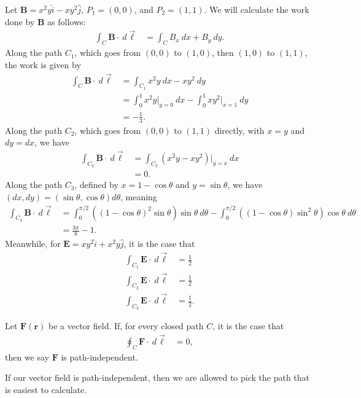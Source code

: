 \documentclass[10pt]{mypackage}
\begin{document}
\begin{example}
  Let $\mathbf{B} = x^2y\widehat{i} - xy^2\widehat{j}$, $P_1 = (0,0)$, and $P_2 = (1,1)$. We will calculate the work done by $\mathbf{B}$ as follows:
  \begin{align*}
    \int_{C}^{} \mathbf{B}\cdot\:d\vec{\ell} &= \int_{C}^{} B_x\:dx + B_y\:dy.
  \end{align*}
  Along the path $C_1$, which goes from $(0,0)$ to $(1,0)$, then $(1,0)$ to $(1,1)$, the work is given by
  \begin{align*}
    \int_{C}^{} \mathbf{B}\cdot\:d\vec{\ell} &= \int_{C_1}^{} x^2y\:dx-xy^2\:dy\\
                                             &= \int_{0}^{1} x^2y\bigr\vert_{y=0}\:dx - \int_{0}^{1} xy^2\bigr\vert_{x=1}\:dy\\
                                             &= -\frac{1}{3}.
  \end{align*}
  Along the path $C_2$, which goes from $(0,0)$ to $(1,1)$ directly, with $x = y$ and $dy = dx$, we have
  \begin{align*}
    \int_{C_2}^{} \mathbf{B}\cdot\:d\vec{\ell} &= \int_{C_2}^{} \left(x^2y-xy^2\right)\bigr\vert_{y=x}\:dx\\
                                               &= 0.
  \end{align*}
  Along the path $C_3$, defined by $x = 1-\cos\theta$ and $y = \sin\theta$, we have $\left(dx,dy\right) = \left(\sin\theta,\cos\theta\right)d\theta$, meaning
  \begin{align*}
    \int_{C_3}^{} \mathbf{B}\cdot\:d\vec{\ell} &= \int_{0}^{\pi/2} \left(\left(1-\cos\theta\right)^2\sin\theta\right)\sin\theta\:d\theta - \int_{0}^{\pi/2} \left(\left(1-\cos\theta\right)\sin^2\theta\right)\cos\theta\:d\theta\\
                                               &= \frac{3\pi}{8}-1.
  \end{align*}
  Meanwhile, for $\mathbf{E} = xy^2\widehat{i} + x^2y\widehat{j}$, it is the case that
  \begin{align*}
    \int_{C_1}^{} \mathbf{E}\cdot\:d\vec{\ell} &= \frac{1}{2}\\
    \int_{C_2}^{} \mathbf{E}\cdot\:d\vec{\ell} &= \frac{1}{2}\\
    \int_{C_3}^{} \mathbf{E}\cdot\:d\vec{\ell} &= \frac{1}{2}.
  \end{align*}
\end{example}
\begin{definition}
  Let $\mathbf{F}\left(\mathbf{r}\right)$ be a vector field. If, for every closed path $C$, it is the case that
  \begin{align*}
    \oint_{C}^{} \mathbf{F}\cdot\:d\vec{\ell} &= 0,
  \end{align*}
  then we say $\mathbf{F}$ is path-independent.
\end{definition}
If our vector field is path-independent, then we are allowed to pick the path that is easiest to calculate.\newline
\end{document}
